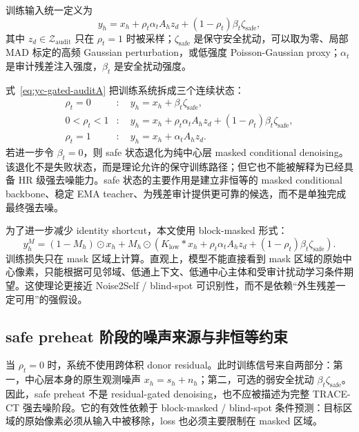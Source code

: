 \documentclass[11pt,a4paper,UTF8,fontset=fandol]{ctexart}
\theoremstyle{definition}
\newcommand{\cZ}{\mathcal{Z}}
\begin{document}
训练输入统一定义为
\begin{equation}
\label{eq:yc-gated-auditA}
    y_h=x_h+\rho_t\alpha_tA_hz_d+(1-\rho_t)\beta_t\zeta_{\mathrm{safe}},
\end{equation}
其中 $z_d\in\cZ_{\mathrm{audit}}$ 只在 $\rho_t=1$ 时被采样；$\zeta_{\mathrm{safe}}$ 是保守安全扰动，可以取为零、局部 MAD 标定的高频 Gaussian perturbation，或低强度 Poisson-Gaussian proxy；$\alpha_t$ 是审计残差注入强度，$\beta_t$ 是安全扰动强度。

式~\eqref{eq:yc-gated-auditA} 把训练系统拆成三个连续状态：
\begin{align}
    \rho_t=0&:\quad y_h=x_h+\beta_t\zeta_{\mathrm{safe}},\\
    0<\rho_t<1&:\quad y_h=x_h+\rho_t\alpha_tA_hz_d+(1-\rho_t)\beta_t\zeta_{\mathrm{safe}},\\
    \rho_t=1&:\quad y_h=x_h+\alpha_tA_hz_d.
\end{align}
若进一步令 $\beta_t=0$，则 safe 状态退化为纯中心层 masked conditional denoising。该退化不是失败状态，而是理论允许的保守训练路径；但它也不能被解释为已经具备 HR 级强去噪能力。safe 状态的主要作用是建立非恒等的 masked conditional backbone、稳定 EMA teacher、为残差审计提供更可靠的候选，而不是单独完成最终强去噪。

为了进一步减少 identity shortcut，本文使用 block-masked 形式：
\begin{equation}
\label{eq:masked-y-gated-auditA}
    y_h^M=(1-M_h)\odot x_h
    +M_h\odot\left(K_{\mathrm{low}}*x_h+\rho_t\alpha_tA_hz_d+(1-\rho_t)\beta_t\zeta_{\mathrm{safe}}\right).
\end{equation}
训练损失只在 mask 区域上计算。直观上，模型不能直接看到 mask 区域的原始中心像素，只能根据可见邻域、低通上下文、低通中心主体和受审计扰动学习条件期望。这使理论更接近 Noise2Self / blind-spot 可识别性，而不是依赖“外生残差一定可用”的强假设。


\subsection{safe preheat 阶段的噪声来源与非恒等约束}

当 $\rho_t=0$ 时，系统不使用跨体积 donor residual。此时训练信号来自两部分：第一，中心层本身的原生观测噪声 $x_h=s_h+n_h$；第二，可选的弱安全扰动 $\beta_t\zeta_{\mathrm{safe}}$。因此，safe preheat 不是 residual-gated denoising，也不应被描述为完整 TRACE-CT 强去噪阶段。它的有效性依赖于 block-masked / blind-spot 条件预测：目标区域的原始像素必须从输入中被移除，loss 也必须主要限制在 masked 区域。
\end{document}
